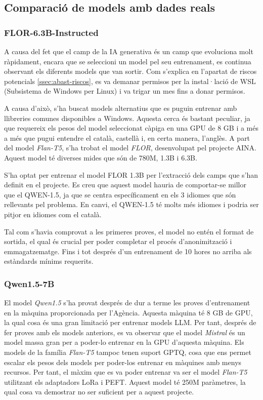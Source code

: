 \subsection{Comparació de models amb dades reals}

\subsubsection{FLOR-6.3B-Instructed}
A causa del fet que el camp de la IA generativa és un camp que evoluciona molt ràpidament, encara que se seleccioni un model pel seu entrenament, es continua observant els diferents models que van sortir. Com s'explica en l'apartat de riscos potencials \ref{ssec:abast-riscos}, es va demanar permisos per la instal·lació de WSL (Subsistema de Windows per Linux) i va trigar un mes fins a donar permisos.

A causa d'això, s'ha buscat models alternatius que es puguin entrenar amb llibreries comunes disponibles a Windows. Aquesta cerca és bastant peculiar, ja que requereix els pesos del model seleccionat càpiga en una GPU de 8 GB i a més a més que pugui entendre el català, castellà i, en certa manera, l'anglès. A part del model \textit{Flan-T5}, s'ha trobat el model \textit{FLOR}, desenvolupat pel projecte AINA. Aquest model té diverses mides que són de 780M, 1.3B i 6.3B.

S'ha optat per entrenar el model FLOR 1.3B per l'extracció dels camps que s'han definit en el projecte. Es creu que aquest model hauria de comportar-se millor que el QWEN-1.5, ja que se centra específicament en els 3 idiomes que són rellevants pel problema. En canvi, el QWEN-1.5 té molts més idiomes i podria ser pitjor en idiomes com el català.

Tal com s'havia comprovat a les primeres proves, el model no entén el format de sortida, el qual és crucial per poder completar el procés d'anonimització i emmagatzematge. Fins i tot després d'un entrenament de 10 hores no arriba als estàndards mínims requerits.

\subsubsection{Qwen1.5-7B}
El model \textit{Qwen1.5} s'ha provat després de dur a terme les proves d'entrenament en la màquina proporcionada per l'Agència. Aquesta màquina té 8 GB de GPU, la qual cosa és una gran limitació per entrenar models LLM. Per tant, després de fer proves amb els models anteriors, es va observar que el model \textit{Mistral} és un model massa gran per a poder-lo entrenar en la GPU d'aquesta màquina. Els models de la família \textit{Flan-T5} tampoc tenen suport GPTQ, cosa que ens permet escalar els pesos dels models per poder-los entrenar en màquines amb menys recursos. Per tant, el màxim que es va poder entrenar va ser el model \textit{Flan-T5} utilitzant els adaptadors LoRa i PEFT. Aquest model té 250M paràmetres, la qual cosa va demostrar no ser suficient per a aquest projecte.

